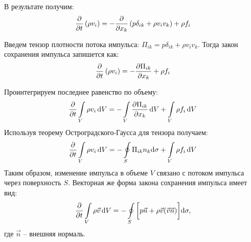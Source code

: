 В результате получим:
\begin{align*}
\pdv{t} \left( \rho v _ { i } \right) = - \frac { \partial } { \partial x _ { k } } \left( p \delta _ { i k } + \rho v _ { i } v _ { k } \right) + \rho f _ { i }
\end{align*}

Введем тензор плотности потока импульса: $ \Pi _ { i k } = p \delta _ { i k } + \rho v _ { i } v _ { k } $. Тогда закон сохранения импульса запишется как:
\begin{align*}
\pdv{t} \left( \rho v _ { i } \right) = - \frac { \partial \Pi _ { i k } } { \partial x _ { k } } + \rho f _ { i }
\end{align*}

Проинтегрируем последнее равенство по объему:
\begin{align*}
\pdv{t} \int \limits_{ V } \rho v _ { i }\dd{V} = - \int \limits_{ V } \frac { \partial \Pi _ { i k } } { \partial x _ { k } }\dd{V} + \int \limits_{ V } \rho f _ { i }\dd{V}
\end{align*}
Используя теорему Остроградского-Гаусса для тензора получаем:
\begin{align*}
\pdv{t} \int \limits_ { V } \rho v _ { i }\dd{V} = - \oint \limits_ { S } \Pi _ { i k } n _ { k } \dd \sigma + \int \limits_ { V } \rho f _ { i }\dd{V}
\end{align*}
Таким образом, изменение импульса в объеме $V$ связано с потоком импульса через поверхность $S$. Векторная же форма закона сохранения импульса имеет вид:
\begin{align*}
\pdv{t} \int \limits_ { V } \rho  \vec{v}\dd{V}  = - \oint \limits_ { S } \qty[\vphantom{\int} p \vec { n } + \rho \vec{v} ( \vec{v} \vec{n} ) ]\dd\sigma,
\end{align*}
где $\vec{n}$ -- внешняя нормаль.

